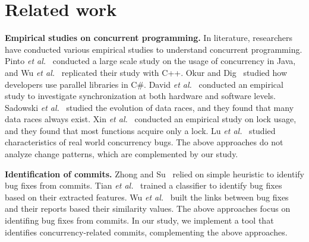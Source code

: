 \section{Related work}
\label{sec:related}
\noindent
\textbf{Empirical studies on concurrent programming.} In literature, researchers have conducted various empirical studies to understand concurrent programming. Pinto \emph{et al.}~\cite{journals/jss/PintoTFFB15} conducted a large scale study on the usage of concurrency in Java, and Wu \emph{et al.}~\cite{journals/infsof/WuCZX16} replicated their study with C++. Okur and Dig~\cite{conf/sigsoft/OkurD12} studied how developers use parallel libraries in C\#. David \emph{et al.}~\cite{conf/sosp/DavidGT13} conducted an empirical study to investigate synchronization at both hardware and software levels. Sadowski \emph{et al.}~\cite{conf/msr/SadowskiYK12} studied the evolution of data races, and they found that many data races always exist. Xin \emph{et al.}~\cite{conf/icsm/XinQHXZWG13} conducted an empirical study on lock usage, and they found that most functions acquire only a lock. Lu \emph{et al.}~\cite{conf/asplos/LuPSZ08} studied characteristics of real world concurrency bugs. The above approaches do not analyze change patterns, which are complemented by our study.


\noindent
\textbf{Identification of commits.} Zhong and Su~\cite{zhong2015bugfix} relied on simple heuristic to identify bug fixes from commits. Tian \emph{et al.}~\cite{tian2012identifying} trained a classifier to identify bug fixes based on their extracted features. Wu \emph{et al.}~\cite{wu2011relink} built the links between bug fixes and their reports based their similarity values. The above approaches focus on identifing bug fixes from commits. In our study, we implement a tool that identifies concurrency-related commits, complementing the above approaches.

